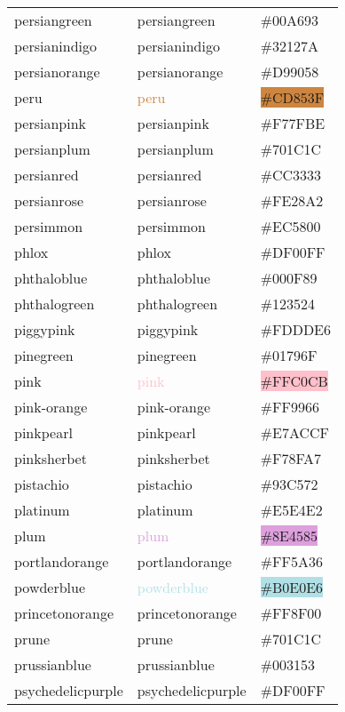 \documentclass[
]{article}
\begin{document}
\begin{longtable}[]{@{}lll@{}}
persiangreen & \textcolor{persiangreen}{persiangreen} &
\colorbox{persiangreen}{\#00A693}\tabularnewline
persianindigo & \textcolor{persianindigo}{persianindigo} &
\colorbox{persianindigo}{\#32127A}\tabularnewline
persianorange & \textcolor{persianorange}{persianorange} &
\colorbox{persianorange}{\#D99058}\tabularnewline
peru & \textcolor{peru}{peru} & \colorbox{peru}{\#CD853F}\tabularnewline
persianpink & \textcolor{persianpink}{persianpink} &
\colorbox{persianpink}{\#F77FBE}\tabularnewline
persianplum & \textcolor{persianplum}{persianplum} &
\colorbox{persianplum}{\#701C1C}\tabularnewline
persianred & \textcolor{persianred}{persianred} &
\colorbox{persianred}{\#CC3333}\tabularnewline
persianrose & \textcolor{persianrose}{persianrose} &
\colorbox{persianrose}{\#FE28A2}\tabularnewline
persimmon & \textcolor{persimmon}{persimmon} &
\colorbox{persimmon}{\#EC5800}\tabularnewline
phlox & \textcolor{phlox}{phlox} &
\colorbox{phlox}{\#DF00FF}\tabularnewline
phthaloblue & \textcolor{phthaloblue}{phthaloblue} &
\colorbox{phthaloblue}{\#000F89}\tabularnewline
phthalogreen & \textcolor{phthalogreen}{phthalogreen} &
\colorbox{phthalogreen}{\#123524}\tabularnewline
piggypink & \textcolor{piggypink}{piggypink} &
\colorbox{piggypink}{\#FDDDE6}\tabularnewline
pinegreen & \textcolor{pinegreen}{pinegreen} &
\colorbox{pinegreen}{\#01796F}\tabularnewline
pink & \textcolor{pink}{pink} & \colorbox{pink}{\#FFC0CB}\tabularnewline
pink-orange & \textcolor{pink-orange}{pink-orange} &
\colorbox{atomictangerine}{\#FF9966}\tabularnewline
pinkpearl & \textcolor{pinkpearl}{pinkpearl} &
\colorbox{pinkpearl}{\#E7ACCF}\tabularnewline
pinksherbet & \textcolor{pinksherbet}{pinksherbet} &
\colorbox{pinksherbet}{\#F78FA7}\tabularnewline
pistachio & \textcolor{pistachio}{pistachio} &
\colorbox{pistachio}{\#93C572}\tabularnewline
platinum & \textcolor{platinum}{platinum} &
\colorbox{platinum}{\#E5E4E2}\tabularnewline
plum & \textcolor{plum}{plum} & \colorbox{plum}{\#8E4585}\tabularnewline
portlandorange & \textcolor{portlandorange}{portlandorange} &
\colorbox{portlandorange}{\#FF5A36}\tabularnewline
powderblue & \textcolor{powderblue}{powderblue} &
\colorbox{powderblue}{\#B0E0E6}\tabularnewline
princetonorange & \textcolor{princetonorange}{princetonorange} &
\colorbox{princetonorange}{\#FF8F00}\tabularnewline
prune & \textcolor{prune}{prune} &
\colorbox{persianplum}{\#701C1C}\tabularnewline
prussianblue & \textcolor{prussianblue}{prussianblue} &
\colorbox{prussianblue}{\#003153}\tabularnewline
psychedelicpurple & \textcolor{psychedelicpurple}{psychedelicpurple} &
\colorbox{phlox}{\#DF00FF}\tabularnewline

\end{longtable}
\end{document}
